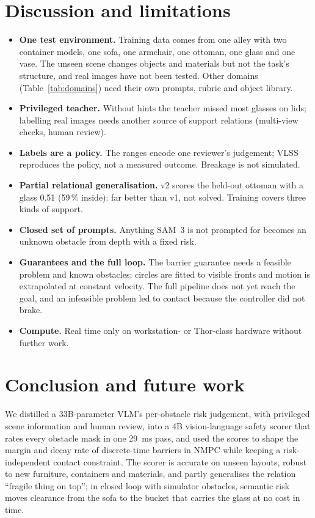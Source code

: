 \documentclass[10pt,a4paper]{article}
\begin{document}
\section{Discussion and limitations}\label{sec:discussion}
\begin{itemize}
\item \textbf{One test environment.} Training data comes from one alley with two container models, one sofa, one armchair, one
ottoman, one glass and one vase. The unseen scene changes objects and materials but not the task's structure, and real images have
not been tested. Other domains (Table~\ref{tab:domains}) need their own prompts, rubric and object library.
\item \textbf{Privileged teacher.} Without hints the teacher missed most glasses on lids; labelling real images needs another source
of support relations (multi-view checks, human review).
\item \textbf{Labels are a policy.} The ranges encode one reviewer's judgement; VLSS reproduces the policy, not a measured outcome.
Breakage is not simulated.
\item \textbf{Partial relational generalisation.} v2 scores the held-out ottoman with a glass 0.51 (59\,\% inside): far better than v1,
not solved. Training covers three kinds of support.
\item \textbf{Closed set of prompts.} Anything SAM~3 is not prompted for becomes an unknown obstacle from depth with a fixed risk.
\item \textbf{Guarantees and the full loop.} The barrier guarantee needs a feasible problem and known obstacles; circles are fitted to
visible fronts and motion is extrapolated at constant velocity. The full pipeline does not yet reach the goal, and an infeasible
problem led to contact because the controller did not brake.
\item \textbf{Compute.} Real time only on workstation- or Thor-class hardware without further work.
\end{itemize}

\section{Conclusion and future work}
We distilled a 33B-parameter VLM's per-obstacle risk judgement, with privileged scene information and human review, into a 4B
vision-language safety scorer that rates every obstacle mask in one 29~ms pass, and used the scores to shape the margin and decay
rate of discrete-time barriers in NMPC while keeping a risk-independent contact constraint. The scorer is accurate on unseen layouts,
robust to new furniture, containers and materials, and partly generalises the relation ``fragile thing on top''; in closed loop with
simulator obstacles, semantic risk moves clearance from the sofa to the bucket that carries the glass at no cost in time.
\end{document}

